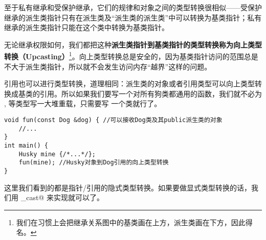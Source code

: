 至于私有继承和受保护继承，它们的规律和对象之间的类型转换很相似——受保护继承的派生类指针只有在派生类及``派生类的派生类''中可以转换为基类指针；私有继承的派生类指针只能在这个类中转换为基类指针。\par
无论继承权限如何，我们都把这种\textbf{派生类指针到基类指针的类型转换称为向上类型转换（Upcasting）}\footnote{我们在习惯上会把继承关系图中的基类画在上方，派生类画在下方，因此得名。}。向上类型转换总是安全的，因为基类指针访问的范围总是不大于派生类指针，所以就不会发生访问内存``越界''这样的问题。\par
引用也可以进行类型转换，道理相同：派生类的对象或者引用类型可以向上类型转换成基类的引用。所以如果我们要写一个对所有狗类都通用的函数，我们就不必为 \lstinline@Husky@, \lstinline@Retriever@ 等类型写一大堆重载，只需要写 \lstinline@Dog@ 一个类就行了。
\begin{lstlisting}
void fun(const Dog &dog) { //可以接收Dog类及其public派生类的对象
    //...
}
int main() {
    Husky mine {/*...*/};
    fun(mine); //Husky对象到Dog引用的向上类型转换
}
\end{lstlisting}\par
这里我们看到的都是指针/引用的隐式类型转换。如果要做显式类型转换的话，我们用 \lstinline@static_cast@ 来实现就可以了。\par
